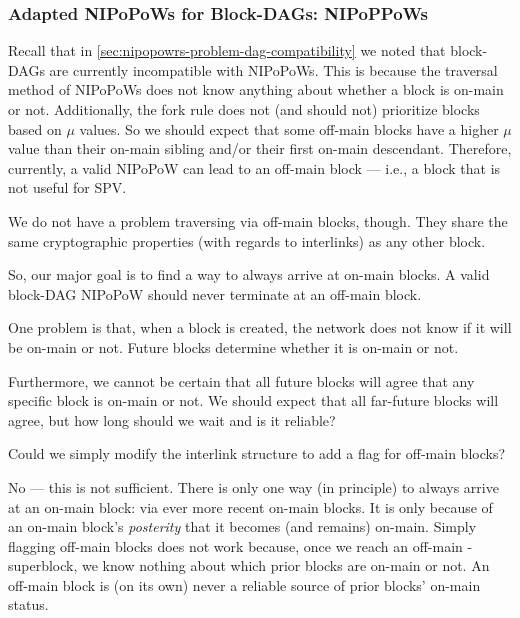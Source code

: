 
\subsubsection{Adapted NIPoPoWs for Block-DAGs: NIPoPPoWs}

\label{sec:blockdag-nipopows}


Recall that in \autoref{sec:nipopowrs-problem-dag-compatibility} we noted that block-DAGs are currently incompatible with NIPoPoWs.
This is because the traversal method of NIPoPoWs does not know anything about whether a block is on-main or not.
Additionally, the fork rule does not (and should not) prioritize blocks based on $\mu$ values.
So we should expect that some off-main blocks have a higher $\mu$ value than their on-main sibling and/or their first on-main descendant.
Therefore, currently, a valid NIPoPoW can lead to an off-main block --- i.e., a block that is not useful for SPV.

We do not have a problem traversing via off-main blocks, though.
They share the same cryptographic properties (with regards to interlinks) as any other block.

So, our major goal is to find a way to always arrive at on-main blocks.
A valid block-DAG NIPoPoW should never terminate at an off-main block.

One problem is that, when a block is created, the network does not know if it will be on-main or not.
Future blocks determine whether it is on-main or not.

Furthermore, we cannot be certain that all future blocks will agree that any specific block is on-main or not.
We should expect that all far-future blocks will agree, but how long should we wait and is it reliable?

Could we simply modify the interlink structure to add a flag for off-main blocks?

No --- this is not sufficient.
There is only one way (in principle) to always arrive at an on-main block: via ever more recent on-main blocks.
It is only because of an on-main block's \emph{posterity} that it becomes (and remains) on-main.
Simply flagging off-main blocks does not work because, once we reach an off-main \mu-superblock, we know nothing about which prior blocks are on-main or not.
An off-main block is (on its own) never a reliable source of prior blocks' on-main status.


